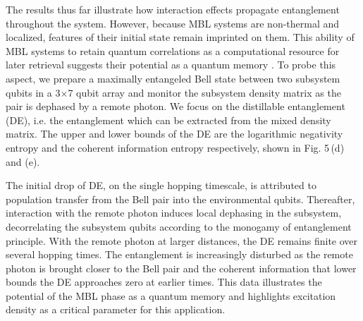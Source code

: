 The results thus far illustrate how interaction effects propagate entanglement throughout the system.  However, because MBL systems are non-thermal and localized, features of their initial state remain imprinted on them.  This ability of MBL systems to retain quantum correlations as a computational resource for later retrieval suggests their potential as a quantum memory \cite{Huse2014, Moore2015, Cirac2017}.  To probe this aspect, we prepare a maximally entangeled Bell state between two subsystem qubits in a 3$\times$7 qubit array and monitor the subsystem density matrix as the pair is dephased by a remote photon. %
We focus on the distillable entanglement (DE), i.e. the entanglement which can be extracted from the mixed density matrix.  The upper and lower bounds of the DE are the logarithmic negativity entropy and the coherent information entropy respectively, shown in Fig. 5\,(d) and (e).

The initial drop of DE, on the single hopping timescale, is attributed to population transfer from the Bell pair into the environmental qubits. Thereafter, interaction with the remote photon induces local dephasing in the subsystem, decorrelating the subsystem qubits according to the monogamy of entanglement principle.  With the remote photon at larger distances, the DE remains finite over several hopping times.  The entanglement is increasingly disturbed as the remote photon is brought closer to the Bell pair and the coherent information that lower bounds the DE approaches zero at earlier times.  This data illustrates the potential of the MBL phase as a quantum memory and highlights excitation density as a critical parameter for this application.

\vspace{1em}

